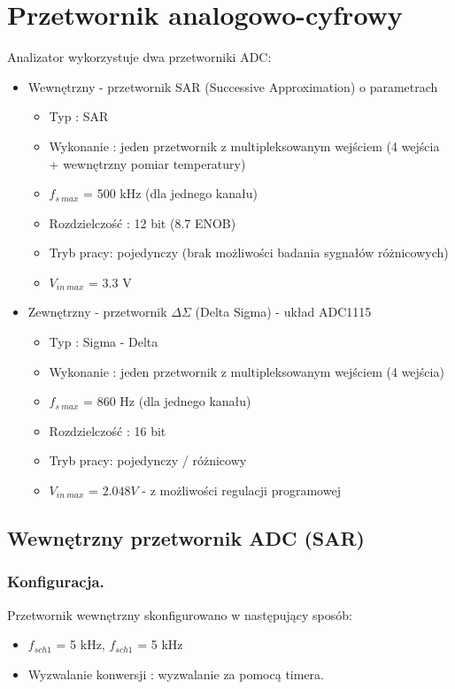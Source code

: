 \section{Przetwornik analogowo-cyfrowy}
Analizator wykorzystuje dwa przetworniki ADC:
\begin{itemize}
    \item Wewnętrzny - przetwornik SAR (Successive Approximation) o parametrach
        \begin{itemize}
            \item Typ : SAR
            \item Wykonanie : jeden przetwornik z multipleksowanym wejściem (4 wejścia + wewnętrzny pomiar temperatury)
            \item $f_{s\ max}$ = 500 kHz (dla jednego kanału)
            \item Rozdzielczość : 12 bit (8.7 ENOB)
            \item Tryb pracy: pojedynczy (brak możliwości badania sygnałów różnicowych) 
            \item $V_{in\ max}$ = 3.3 V
        \end{itemize}
        
    \item Zewnętrzny - przetwornik $\Delta\Sigma$ (Delta Sigma) - układ ADC1115
        \begin{itemize}
            \item Typ : Sigma - Delta
            \item Wykonanie : jeden przetwornik z multipleksowanym wejściem (4 wejścia) 
            \item $f_{s\ max}$ = 860 Hz (dla jednego kanału)
            \item Rozdzielczość : 16 bit 
            \item Tryb pracy: pojedynczy / różnicowy
            \item $V_{in\ max}$ = $2.048V$ - z możliwości regulacji programowej
        \end{itemize}
\end{itemize}

\subsection{Wewnętrzny przetwornik ADC (SAR)}
\subsubsection{Konfiguracja.}
Przetwornik wewnętrzny skonfigurowano w następujący sposób:
    \begin{itemize}
        \item $f_{sch1}$ = 5 kHz, $f_{sch1}$ = 5 kHz
        \item Wyzwalanie konwersji : wyzwalanie za pomocą timera. 
    \end{itemize}

